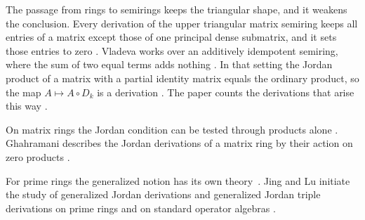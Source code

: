 The passage from rings to semirings keeps the triangular shape, and it weakens
the conclusion.
Every derivation of the upper triangular matrix semiring keeps all
entries of a matrix except those of one principal dense submatrix, and it sets
those entries to zero \cite[Theorem~1, p.~5]{Vladeva2018Semirings}. Vladeva
works over an additively idempotent semiring, where the sum of two equal terms
adds nothing \cite[Proposition~1, p.~3]{Vladeva2018Semirings}. In that setting
the Jordan product of a matrix with a partial identity matrix equals the
ordinary product, so the map $A\mapsto A\circ D_k$ is a derivation
\cite[Proposition~1, p.~3]{Vladeva2018Semirings}. The paper counts the
derivations that arise this way \cite[Theorem~1, p.~5]{Vladeva2018Semirings}.

On matrix rings the Jordan condition can be tested through products alone
\cite[Abstract]{Ghahramani2015ZeroJordan}. Ghahramani describes the Jordan
derivations of a matrix ring by their action on zero products
\cite[Abstract]{Ghahramani2015ZeroJordan}.

For prime rings the generalized notion has its own theory~\cite[Abstract, p.~605]{JingLu2003GeneralizedJordan}. Jing and Lu
initiate the study of generalized Jordan derivations and generalized Jordan
triple derivations on prime rings and on standard operator algebras
\cite[Abstract, p.~605]{JingLu2003GeneralizedJordan}.

